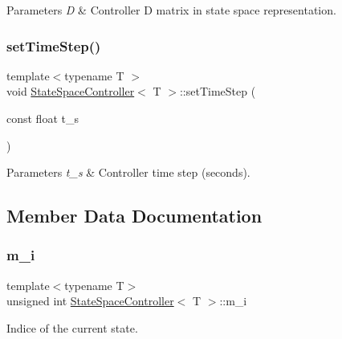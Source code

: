 \begin{DoxyParams}{Parameters}
{\em D} & Controller D matrix in state space representation. \\
\hline
\end{DoxyParams}
\mbox{\label{classStateSpaceController_a2e3ce5df26ef4e0d89c7ff8668a6d5c5}} 
\subsubsection{\texorpdfstring{set\+Time\+Step()}{setTimeStep()}}
{\footnotesize\ttfamily template$<$typename T $>$ \\
void \hyperlink{classStateSpaceController}{State\+Space\+Controller}$<$ T $>$\+::set\+Time\+Step (\begin{DoxyParamCaption}\item[{const float}]{t\+\_\+s }\end{DoxyParamCaption})}


\begin{DoxyParams}{Parameters}
{\em t\+\_\+s} & Controller time step (seconds). \\
\hline
\end{DoxyParams}


\subsection{Member Data Documentation}
\mbox{\label{classStateSpaceController_acdeb5cd37612bfb9553b5d726108c4df}} 
\subsubsection{\texorpdfstring{m\+\_\+i}{m\_i}}
{\footnotesize\ttfamily template$<$typename T$>$ \\
unsigned int \hyperlink{classStateSpaceController}{State\+Space\+Controller}$<$ T $>$\+::m\+\_\+i\hspace{0.3cm}{\ttfamily [protected]}}



Indice of the current state. 

